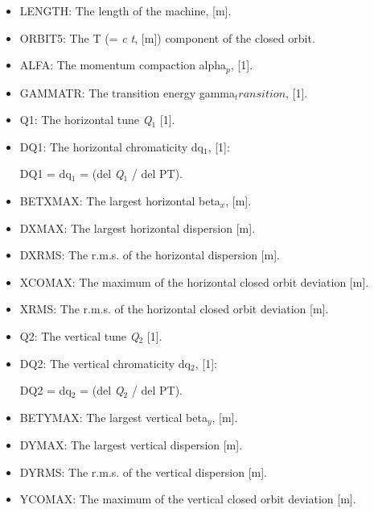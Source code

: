 \begin{itemize}
	\item LENGTH: The length of the machine, [m].     


	\item ORBIT5: The T (= \textit{c t}, [m]) component of the closed orbit.     


	\item ALFA: The momentum compaction alpha$_p$, [1].     


	\item GAMMATR: The transition energy gamma$_transition$, [1].     


	\item Q1: The horizontal tune \textit{Q$_1$} [1].     


	\item DQ1: The horizontal chromaticity dq$_\textit{1}$, [1]:     

DQ1 = dq$_\textit{1}$ = (del \textit{Q$_1$} / del PT).     


	\item BETXMAX: The largest horizontal beta$_\textit{x}$, [m].     


	\item DXMAX: The largest horizontal dispersion [m].     


	\item DXRMS: The r.m.s. of the horizontal dispersion [m].     


	\item XCOMAX: The maximum of the horizontal closed orbit deviation [m].     


	\item XRMS: The r.m.s. of the horizontal closed orbit deviation [m].     


	\item Q2: The vertical tune \textit{Q$_2$} [1].     


	\item DQ2: The vertical chromaticity dq$_\textit{2}$, [1]:     

DQ2 = dq$_\textit{2}$ = (del \textit{Q$_2$} / del PT).     


	\item BETYMAX: The largest vertical beta$_\textit{y}$, [m].     


	\item DYMAX: The largest vertical dispersion [m].     


	\item DYRMS: The r.m.s. of the vertical dispersion [m].     


	\item YCOMAX: The maximum of the vertical closed orbit deviation [m].     



\end{itemize}
